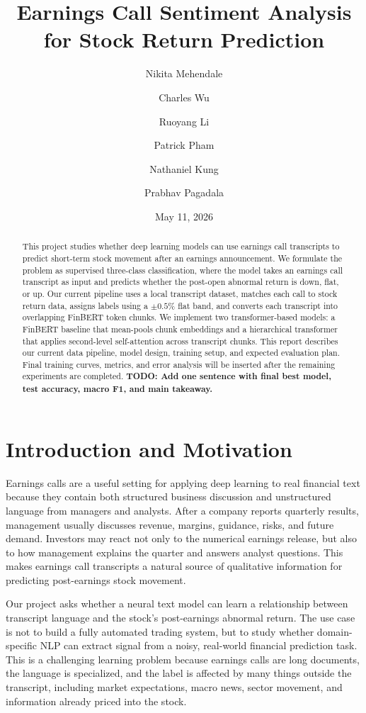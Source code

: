 \documentclass[11pt]{article}
\title{Earnings Call Sentiment Analysis for Stock Return Prediction}
\author{Nikita Mehendale \and Charles Wu \and Ruoyang Li \and Patrick Pham \and Nathaniel Kung \and Prabhav Pagadala}
\date{May 11, 2026}
\begin{document}
\maketitle

\begin{abstract}
This project studies whether deep learning models can use earnings call transcripts to predict short-term stock movement after an earnings announcement. We formulate the problem as supervised three-class classification, where the model takes an earnings call transcript as input and predicts whether the post-open abnormal return is down, flat, or up. Our current pipeline uses a local transcript dataset, matches each call to stock return data, assigns labels using a $\pm 0.5\%$ flat band, and converts each transcript into overlapping FinBERT token chunks. We implement two transformer-based models: a FinBERT baseline that mean-pools chunk embeddings and a hierarchical transformer that applies second-level self-attention across transcript chunks. This report describes our current data pipeline, model design, training setup, and expected evaluation plan. Final training curves, metrics, and error analysis will be inserted after the remaining experiments are completed. \textbf{TODO: Add one sentence with final best model, test accuracy, macro F1, and main takeaway.}
\end{abstract}

\section{Introduction and Motivation}

Earnings calls are a useful setting for applying deep learning to real financial text because they contain both structured business discussion and unstructured language from managers and analysts. After a company reports quarterly results, management usually discusses revenue, margins, guidance, risks, and future demand. Investors may react not only to the numerical earnings release, but also to how management explains the quarter and answers analyst questions. This makes earnings call transcripts a natural source of qualitative information for predicting post-earnings stock movement.

Our project asks whether a neural text model can learn a relationship between transcript language and the stock's post-earnings abnormal return. The use case is not to build a fully automated trading system, but to study whether domain-specific NLP can extract signal from a noisy, real-world financial prediction task. This is a challenging learning problem because earnings calls are long documents, the language is specialized, and the label is affected by many things outside the transcript, including market expectations, macro news, sector movement, and information already priced into the stock.
\end{document}
